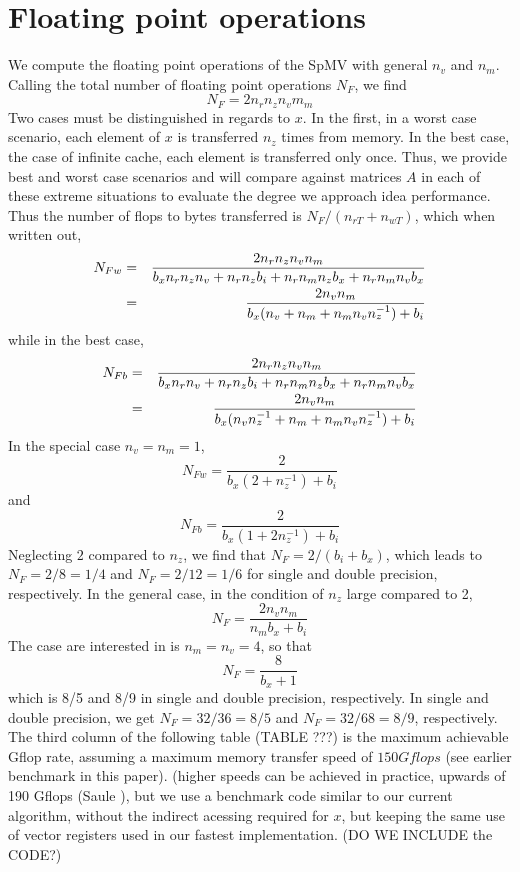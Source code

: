 \section{Floating point operations}
We compute the floating point operations of the SpMV with general $n_v$ and $n_m$. Calling the total number of floating point operations $N_F$, we find
$$
  N_F = 2 n_r n_z n_v m_m
$$
Two cases must be distinguished in regards to $x$. In the first, in a worst case scenario, each element 
of $x$ is transferred $n_z$ times from memory. In the best case, the case of infinite cache, each element is transferred only once. Thus, we provide best and worst case scenarios and will compare against matrices $A$
in each of these extreme situations to evaluate the degree we approach idea performance. 
Thus the number of flops to bytes transferred is $N_F / (n_{rT} + n_{wT})$, which when written out, 
\begin{eqnarray}
N_{Fw} &=& \frac{2 n_r n_z n_v n_m}{b_x n_r n_z n_v  + n_r n_z b_i + n_r n_m n_z b_x + n_r n_m n_v b_x} \nonumber \\
    &=& \frac{2 n_v n_m}{b_x ( n_v + n_m + n_m n_v n_z^{-1}) + b_i}  \nonumber \\
\end{eqnarray}
while in the best case, 
\begin{eqnarray}
N_{Fb} &=& \frac{2 n_r n_z n_v n_m}{b_x n_r n_v  + n_r n_z b_i + n_r n_m n_z b_x + n_r n_m n_v b_x} \nonumber \\
    &=& \frac{2 n_v n_m}{b_x ( n_v n_z^{-1} + n_m  + n_m n_v n_z^{-1}) + b_i } 
\end{eqnarray}
In the special case $n_v=n_m=1$, 
$$
N_{Fw} = \frac{2}{b_x (2+n_z^{-1}) + b_i}
$$
and 
$$
N_{Fb} = \frac{2}{b_x (1 + 2 n_z^{-1}) + b_i}
$$
Neglecting $2$ compared to $n_z$, we find that $N_F = 2/(b_i+b_x)$, which leads to 
$N_F = 2/8=1/4$ and  $N_F=2/12=1/6$ for single and double precision, respectively. 
In the general case, in the condition of $n_z$ large compared to 2, 
$$
N_F =  \frac{2 n_v n_m}{n_m b_x + b_i}
$$ 
The case are interested in is $n_m=n_v=4$, so that
$$
N_F = \frac{8}{ b_x + 1}
$$
which is 8/5 and 8/9 in single and double precision, respectively. 
In single and double precision, we get $N_F=32/36=8/5$ and $N_F=32/68=8/9$, respectively.
The third column of the following table (TABLE ???) is the maximum achievable Gflop rate, assuming 
a maximum memory transfer speed of $150 Gflops$ (see earlier benchmark in this paper). 
(higher speeds can be achieved in practice,  upwards of 190 Gflops (Saule \etal\cite{}), but we use
a benchmark code similar to our current algorithm, without the indirect acessing required for $x$, but keeping the same use of vector registers used in our fastest implementation. (DO WE INCLUDE the CODE?)

